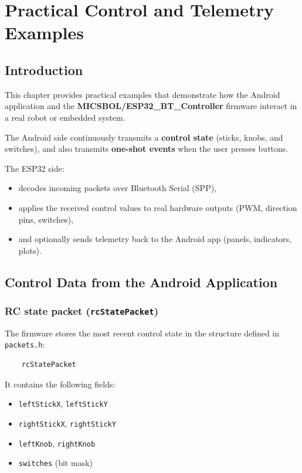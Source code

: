 \chapter{Practical Control and Telemetry Examples}
\label{ch:practical-examples}

\section{Introduction}
\label{sec:practical-intro}

This chapter provides practical examples that demonstrate how the Android application
and the \textbf{MICSBOL/ESP32\_BT\_Controller} firmware interact in a real robot or embedded system.

The Android side continuously transmits a \textbf{control state} (sticks, knobs, and switches),
and also transmits \textbf{one-shot events} when the user presses buttons.

The ESP32 side:
\begin{itemize}
    \item decodes incoming packets over Bluetooth Serial (SPP),
    \item applies the received control values to real hardware outputs (PWM, direction pins, switches),
    \item and optionally sends telemetry back to the Android app (panels, indicators, plots).
\end{itemize}

\section{Control Data from the Android Application}
\label{sec:control-data}

\subsection{RC state packet (\texttt{rcStatePacket})}
The firmware stores the most recent control state in the structure defined in \texttt{packets.h}:

\begin{verbatim}
    rcStatePacket
\end{verbatim}

It contains the following fields:

\begin{itemize}
    \item \texttt{leftStickX}, \texttt{leftStickY}
    \item \texttt{rightStickX}, \texttt{rightStickY}
    \item \texttt{leftKnob}, \texttt{rightKnob}
    \item \texttt{switches} (bit mask)
\end{itemize}


